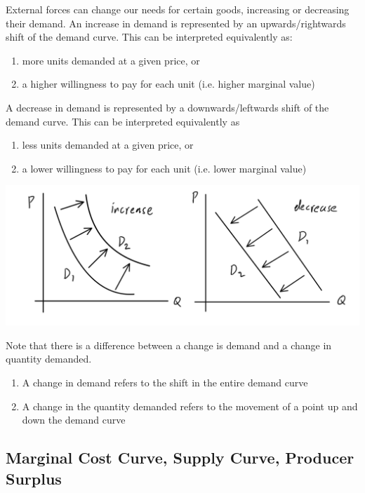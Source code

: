 \documentclass{article}
\begin{document}
    \begin{definition}
      External forces can change our needs for certain goods, increasing or decreasing their demand. An increase in demand is represented by an upwards/rightwards shift of the demand curve. This can be interpreted equivalently as: 
      \begin{enumerate}
        \item more units demanded at a given price, or 
        \item a higher willingness to pay for each unit (i.e. higher marginal value)
      \end{enumerate}
      A decrease in demand is represented by a downwards/leftwards shift of the demand curve. This can be interpreted equivalently as 
      \begin{enumerate}
        \item less units demanded at a given price, or 
        \item a lower willingness to pay for each unit (i.e. lower marginal value) 
      \end{enumerate}
      \begin{center}
        \includegraphics[scale=0.25]{img/Shift_In_Demand.PNG}
      \end{center}
    \end{definition}

    Note that there is a difference between a change is demand and a change in quantity demanded.
    \begin{enumerate}
      \item A change in demand refers to the shift in the entire demand curve
      \item A change in the quantity demanded refers to the movement of a point up and down the demand curve 
    \end{enumerate}

  \subsection{Marginal Cost Curve, Supply Curve, Producer Surplus}
\end{document}
